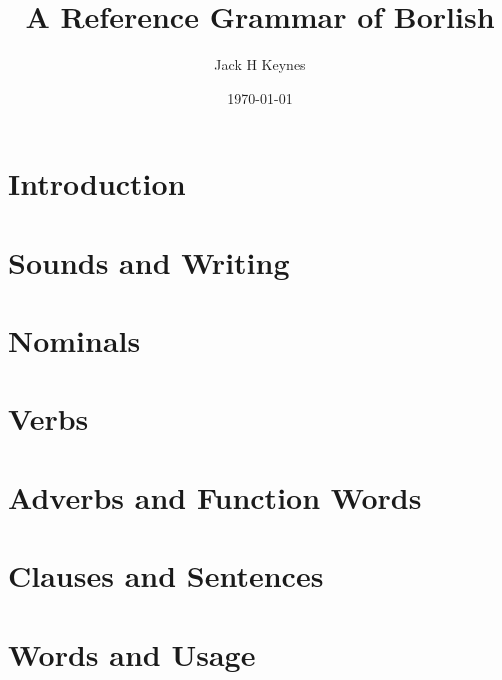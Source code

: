\documentclass[12pt,oneside]{memoir}
\title{A Reference Grammar of Borlish}
\author{Jack H Keynes}
\date{\today}
\begin{document}
\frontmatter
\maketitle
\tableofcontents*


\mainmatter

\part{Introduction}



\part{Sounds and Writing}




\part{Nominals}






\part{Verbs}





\part{Adverbs and Function Words}




\part{Clauses and Sentences}








\part{Words and Usage}




\appendix
\appendixpage





\backmatter
\end{document}
